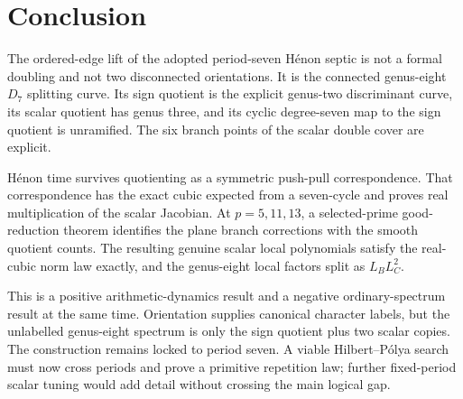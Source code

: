 \section{Conclusion}

The ordered-edge lift of the adopted period-seven H\'enon septic is not a
formal doubling and not two disconnected orientations.  It is the connected
genus-eight $D_7$ splitting curve.  Its sign quotient is the explicit
genus-two discriminant curve, its scalar quotient has genus three, and its
cyclic degree-seven map to the sign quotient is unramified.  The six branch
points of the scalar double cover are explicit.

H\'enon time survives quotienting as a symmetric push-pull correspondence.
That correspondence has the exact cubic expected from a seven-cycle and
proves real multiplication of the scalar Jacobian.  At $p=5,11,13$, a
selected-prime good-reduction theorem identifies the plane branch corrections
with the smooth quotient counts.  The resulting genuine scalar local
polynomials satisfy the real-cubic norm law exactly, and the genus-eight
local factors split as $L_B L_C^2$.

This is a positive arithmetic-dynamics result and a negative ordinary-spectrum
result at the same time.  Orientation supplies canonical character labels,
but the unlabelled genus-eight spectrum is only the sign quotient plus two
scalar copies.  The construction remains locked to period seven.  A viable
Hilbert--P\'olya search must now cross periods and prove a primitive repetition
law; further fixed-period scalar tuning would add detail without crossing the
main logical gap.
